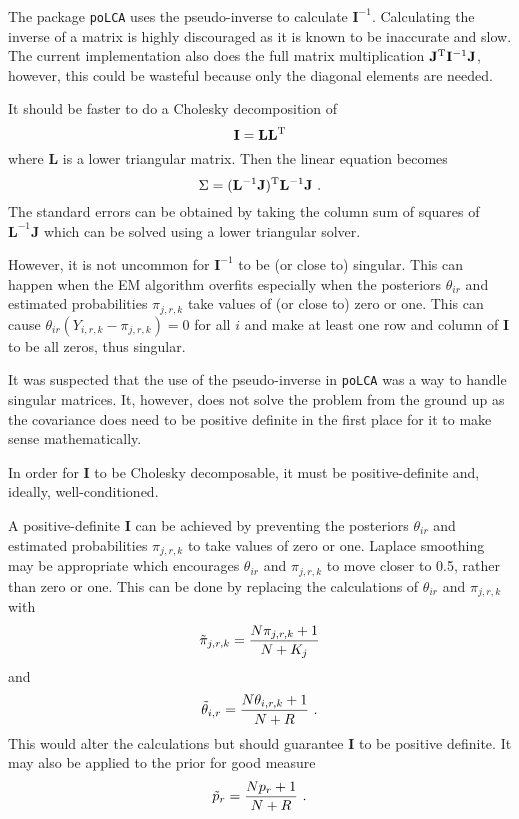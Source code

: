 \documentclass{article}
\newcommand{\T}{^\textup{T}}
\begin{document}
The package \texttt{poLCA} uses the pseudo-inverse to calculate $\mathbf{I}^{-1}$. Calculating the inverse of a matrix is highly discouraged as it is known to be inaccurate and slow. The current implementation also does the full matrix multiplication $\mathbf{J}\T \mathbf{I}^{-1} \mathbf{J}$, however, this could be wasteful because only the diagonal elements are needed.

It should be faster to do a Cholesky decomposition of
\begin{equation}
    \mathbf{I}=\mathbf{L}\mathbf{L}\T
\end{equation}
where $\mathbf{L}$ is a lower triangular matrix. Then the linear equation becomes
\begin{equation}
    \Sigma = (\mathbf{L}^{-1}\mathbf{J})\T \mathbf{L}^{-1} \mathbf{J} \ .
\end{equation}
The standard errors can be obtained by taking the column sum of squares of $\mathbf{L}^{-1} \mathbf{J}$ which can be solved using a lower triangular solver.

However, it is not uncommon for $\mathbf{I}^{-1}$ to be (or close to) singular. This can happen when the EM algorithm overfits especially when the posteriors $\theta_{ir}$ and estimated probabilities $\pi_{j,r,k}$ take values of (or close to) zero or one. This can cause $\theta_{ir}(Y_{i,r,k}-\pi_{j,r,k})=0$ for all $i$ and make at least one row and column of $\mathbf{I}$ to be all zeros, thus singular.

It was suspected that the use of the pseudo-inverse in \texttt{poLCA} was a way to handle singular matrices. It, however, does not solve the problem from the ground up as the covariance does need to be positive definite in the first place for it to make sense mathematically.

In order for $\mathbf{I}$ to be Cholesky decomposable, it must be positive-definite and, ideally, well-conditioned.

A positive-definite $\mathbf{I}$ can be achieved by preventing the posteriors $\theta_{ir}$ and estimated probabilities $\pi_{j,r,k}$ to take values of zero or one. Laplace smoothing may be appropriate which encourages $\theta_{ir}$ and $\pi_{j,r,k}$ to move closer to 0.5, rather than zero or one. This can be done by replacing the calculations of $\theta_{ir}$ and $\pi_{j,r,k}$ with
\begin{equation}
    \Tilde{\pi}_{j,r,k} = \dfrac{N\pi_{j,r,k} + 1}{N + K_j}
\end{equation}
and
\begin{equation}
    \Tilde{\theta}_{i,r} = \dfrac{N\theta_{i,r,k} + 1}{N + R}
    \ .
\end{equation}
This would alter the calculations but should guarantee $\mathbf{I}$ to be positive definite. It may also be applied to the prior for good measure
\begin{equation}
    \Tilde{p}_{r} = \dfrac{N p_{r} + 1}{N + R}
    \ .
\end{equation}
\end{document}
